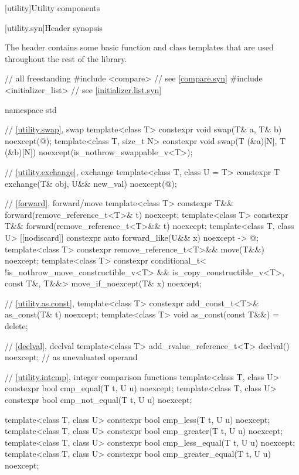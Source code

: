 [utility]{Utility components}

[utility.syn]{Header  synopsis}

\pnum
The header 
contains some basic function and class templates that are used
throughout the rest of the library.

\begin{codeblock}
// all freestanding
#include <compare>              // see \ref{compare.syn}
#include <initializer_list>     // see \ref{initializer.list.syn}

namespace std {
  // \ref{utility.swap}, swap
  template<class T>
    constexpr void swap(T& a, T& b) noexcept(@\seebelow@);
  template<class T, size_t N>
    constexpr void swap(T (&a)[N], T (&b)[N]) noexcept(is_nothrow_swappable_v<T>);

  // \ref{utility.exchange}, exchange
  template<class T, class U = T>
    constexpr T exchange(T& obj, U&& new_val) noexcept(@\seebelow@);

  // \ref{forward}, forward/move
  template<class T>
    constexpr T&& forward(remove_reference_t<T>& t) noexcept;
  template<class T>
    constexpr T&& forward(remove_reference_t<T>&& t) noexcept;
  template<class T, class U>
    [[nodiscard]] constexpr auto forward_like(U&& x) noexcept -> @\seebelow@;
  template<class T>
    constexpr remove_reference_t<T>&& move(T&&) noexcept;
  template<class T>
    constexpr conditional_t<
        !is_nothrow_move_constructible_v<T> && is_copy_constructible_v<T>, const T&, T&&>
      move_if_noexcept(T& x) noexcept;

  // \ref{utility.as.const}, 
  template<class T>
    constexpr add_const_t<T>& as_const(T& t) noexcept;
  template<class T>
    void as_const(const T&&) = delete;

  // \ref{declval}, declval
  template<class T>
    add_rvalue_reference_t<T> declval() noexcept;   // as unevaluated operand

  // \ref{utility.intcmp}, integer comparison functions
  template<class T, class U>
    constexpr bool cmp_equal(T t, U u) noexcept;
  template<class T, class U>
    constexpr bool cmp_not_equal(T t, U u) noexcept;

  template<class T, class U>
    constexpr bool cmp_less(T t, U u) noexcept;
  template<class T, class U>
    constexpr bool cmp_greater(T t, U u) noexcept;
  template<class T, class U>
    constexpr bool cmp_less_equal(T t, U u) noexcept;
  template<class T, class U>
    constexpr bool cmp_greater_equal(T t, U u) noexcept;

}
\end{codeblock}
